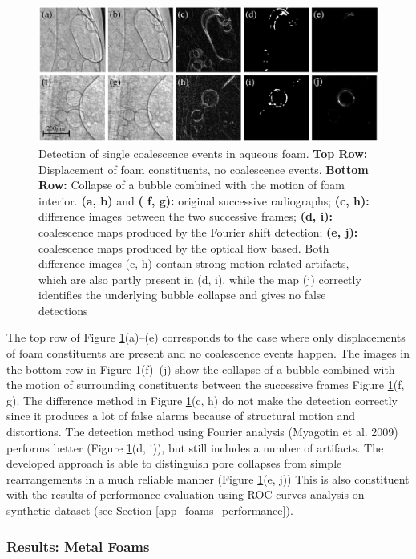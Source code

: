 \begin{figure}[ht]
  \centerline{
    \mbox{\includegraphics[scale=0.51]{figures/foam_aqua.png}}
  }
  \caption[]{Detection of single coalescence events in aqueous foam. \textbf{Top Row:} Displacement of foam constituents, no coalescence events. \textbf{Bottom Row:} Collapse of a bubble
combined with the motion of foam interior. \textbf{(a, b)} and \textbf{( f, g):} original successive radiographs; \textbf{(c, h):} difference
images between the two successive frames; \textbf{(d, i):} coalescence maps produced by the Fourier shift detection; \textbf{(e, j):} coalescence maps produced by the optical flow based. Both difference images (c, h) contain strong motion-related artifacts, which are also partly present in (d, i), while the map (j) correctly identifies the underlying bubble collapse and gives no false detections}
  \label{fig:foam_aqua}
\end{figure}

The top row of Figure \ref{fig:foam_aqua}(a)–(e) corresponds to the case where only displacements
of foam constituents are present and no coalescence events happen. The images in the bottom row in Figure \ref{fig:foam_aqua}(f)–(j) show the collapse of a bubble
combined with the motion of surrounding constituents between the successive frames Figure \ref{fig:foam_aqua}(f, g). The difference method  in Figure \ref{fig:foam_aqua}(c, h) do not make the detection correctly since it produces a lot of false alarms because of structural motion and distortions. The detection method using Fourier analysis 
(Myagotin et al. 2009) performs better (Figure \ref{fig:foam_aqua}(d, i)),
but still includes a number of artifacts. The developed approach is able to distinguish pore collapses from simple rearrangements in
a much reliable manner (Figure \ref{fig:foam_aqua}(e, j)) This is also constituent with the results of performance evaluation using ROC curves analysis on synthetic dataset (see Section \ref{app_foams_performance}).


\subsubsection{Results: Metal Foams}
\label{foam_metal}

